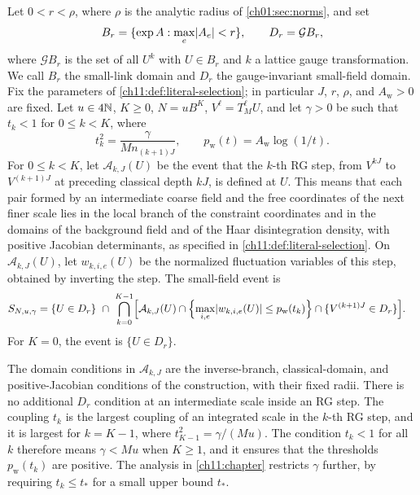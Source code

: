 \begin{definition}\label{ch01:def:selected-law}
Let $0<r<\rho$, where $\rho$ is the analytic radius of \cref{ch01:sec:norms}, and set
\[
 B_r=\{\exp A:\max_e\lvert A_e\rvert<r\},\qquad D_r=\mathcal GB_r,
\]
where $\mathcal GB_r$ is the set of all $U^k$ with $U\in B_r$ and $k$ a lattice gauge transformation.
We call $B_r$ the small-link domain and $D_r$ the gauge-invariant small-field domain. Fix the parameters of \cref{ch11:def:literal-selection}; in particular $J$, $r$, $\rho$, and $A_{\mathrm w}>0$ are fixed. Let $u\in4\mathbb N$, $K\ge0$, $N=uB^K$, $V^\ell=T_M^\ell U$, and let $\gamma>0$ be such that $t_k<1$ for $0\le k<K$, where
\[
 t_k^2=\frac{\gamma}{Mn_{(k+1)J}},\qquad p_{\mathrm w}(t)=A_{\mathrm w}\log(1/t).
\]
For $0\le k<K$, let $\mathcal A_{k,J}(U)$ be the event that the $k$-th RG step, from $V^{kJ}$ to $V^{(k+1)J}$ at preceding classical depth $kJ$, is defined at $U$. This means that each pair formed by an intermediate coarse field and the free coordinates of the next finer scale lies in the local branch of the constraint coordinates and in the domains of the background field and of the Haar disintegration density, with positive Jacobian determinants, as specified in \cref{ch11:def:literal-selection}. On $\mathcal A_{k,J}(U)$, let $w_{k,i,e}(U)$ be the normalized fluctuation variables of this step, obtained by inverting the step. The small-field event is
\begin{equation}\label{ch01:eq:literal-event}
 \begin{split}
 S_{N,u,\gamma}={}&\{U\in D_r\}\ \cap\
 \bigcap_{k=0}^{K-1}\Bigl[
    \mathcal A_{k,J}(U)
    \cap\Bigl\{\max_{i,e}\lvert w_{k,i,e}(U)\rvert\le p_{\mathrm w}(t_k)\Bigr\}
    \cap\{V^{(k+1)J}\in D_r\}\Bigr].
 \end{split}
\end{equation}
For $K=0$, the event is $\{U\in D_r\}$.
\end{definition}

The domain conditions in $\mathcal A_{k,J}$ are the inverse-branch, classical-domain, and positive-Jacobian conditions of the construction, with their fixed radii. There is no additional $D_r$ condition at an intermediate scale inside an RG step. The coupling $t_k$ is the largest coupling of an integrated scale in the $k$-th RG step, and it is largest for $k=K-1$, where $t_{K-1}^2=\gamma/(Mu)$. The condition $t_k<1$ for all $k$ therefore means $\gamma<Mu$ when $K\ge1$, and it ensures that the thresholds $p_{\mathrm w}(t_k)$ are positive. The analysis in \cref{ch11:chapter} restricts $\gamma$ further, by requiring $t_k\le t_*$ for a small upper bound $t_*$.

